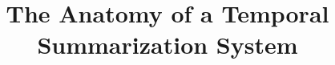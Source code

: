 \documentclass{sig-alternate}
\begin{document}
%

\title{The Anatomy of a Temporal Summarization System}

\author{}
%
%
%
%
%

%
%
%
\end{document}
